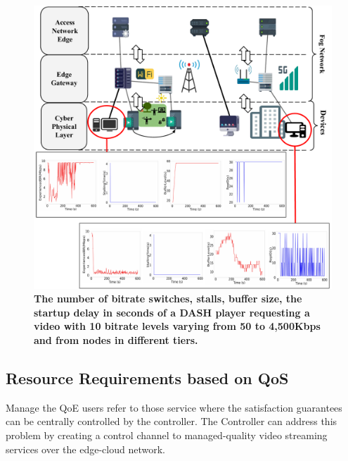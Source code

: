 \begin{figure}
    \centering
    \includegraphics[width=0.9\linewidth]{images/qoe-multi-level.pdf}
    \caption{\textbf{The number of bitrate switches, stalls, buffer size, the startup delay in seconds of a DASH player requesting a video with 10 bitrate levels varying from 50 to 4,500Kbps and from nodes in different tiers.}}
    \label{fig:impact-two-layers}
\end{figure}

\subsection{Resource Requirements based on QoS}

Manage the QoE users refer to those service where the satisfaction guarantees can be centrally controlled by the controller. The Controller can address this problem by creating a control channel to managed-quality video streaming services over the edge-cloud network.
